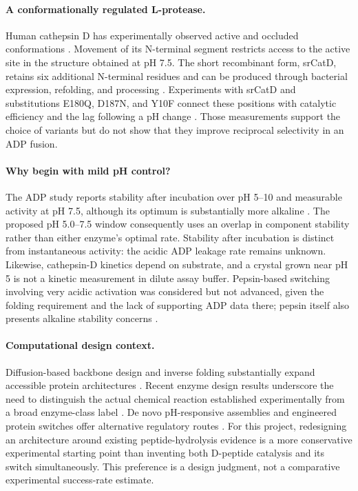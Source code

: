 \documentclass{article}
\begin{document}
\paragraph{A conformationally regulated L-protease.}
Human cathepsin D has experimentally observed active and occluded conformations
\citep{baldwin1993,lee1998}. Movement of its N-terminal segment restricts access
to the active site in the structure obtained at pH 7.5. The short recombinant
form, srCatD, retains six additional N-terminal residues and can be produced
through bacterial expression, refolding, and processing \citep{beyer1996}.
Experiments with srCatD and substitutions E180Q, D187N, and Y10F connect these
positions with catalytic efficiency and the lag following a pH change
\citep{goldfarb2005}. Those measurements support the choice of variants but
do not show that they improve reciprocal selectivity in an ADP fusion.

\paragraph{Why begin with mild pH control?}
The ADP study reports stability after incubation over pH 5--10 and measurable
activity at pH 7.5, although its optimum is substantially more alkaline
\citep{asano1996}. The proposed pH 5.0--7.5 window consequently uses an overlap
in component stability rather than either enzyme's optimal rate. Stability
after incubation is distinct from instantaneous activity: the acidic ADP
leakage rate remains unknown. Likewise, cathepsin-D kinetics depend on substrate,
and a crystal grown near pH 5 is not a kinetic measurement in dilute assay buffer.
Pepsin-based switching involving very acidic activation was considered but not
advanced, given the folding requirement and the lack of supporting ADP data
there; pepsin itself also presents alkaline stability concerns \citep{konno2000}.

\paragraph{Computational design context.}
Diffusion-based backbone design and inverse folding substantially expand
accessible protein architectures \citep{watson2023,dauparas2022,dauparas2025,rfdiffusion2}.
Recent enzyme design results underscore the need to distinguish the actual
chemical reaction established experimentally from a broad enzyme-class label
\citep{lauko2025}. De novo pH-responsive assemblies and engineered protein
switches offer alternative regulatory routes \citep{boyken2019,dagliyan2018}.
For this project, redesigning an architecture around existing peptide-hydrolysis
evidence is a more conservative experimental starting point than inventing
both D-peptide catalysis and its switch simultaneously. This preference is a
design judgment, not a comparative experimental success-rate estimate.
\end{document}
